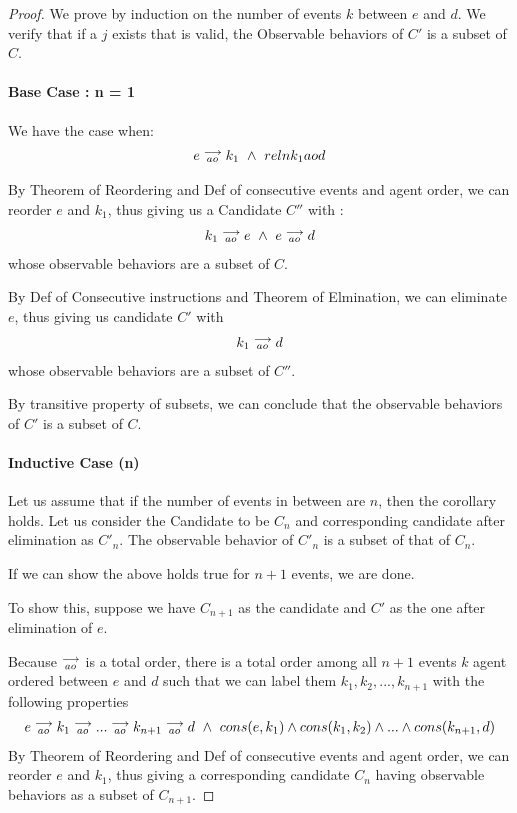 \begin{proof}
    We prove by induction on the number of events $k$ between $e$ and $d$. We verify that if a $j$ exists that is valid, the Observable behaviors of $C'$ is a subset of $C$.

    \paragraph{Base Case : n = 1}

        We have the case when:
        \begin{align*}
            e\stackrel{\longrightarrow}{_{ao}}k_1 \ \wedge \ reln{k_1}{ao}{d}
        \end{align*}

        By Theorem of Reordering and Def of consecutive events and agent order, we can reorder $e$ and $k_1$, thus giving us a Candidate $C''$ with :
        \begin{align*}
            k_1\stackrel{\longrightarrow}{_{ao}}e \ \wedge \ e\stackrel{\longrightarrow}{_{ao}}d
        \end{align*}  
        whose observable behaviors are a subset of $C$.

        By Def of Consecutive instructions and Theorem of Elmination, we can eliminate $e$, thus giving us candidate $C'$  with  
        \begin{align*}
            k_1\stackrel{\longrightarrow}{_{ao}}d
        \end{align*} 
        whose observable behaviors are a subset of $C''$.

        By transitive property of subsets, we can conclude that the observable behaviors of $C'$ is a subset of $C$. 
    \paragraph{Inductive Case (n)}

        Let us assume that if the number of events in between are $n$, then the corollary holds. Let us consider the Candidate to be $C_n$ and corresponding candidate after elimination as $C'_n$. The observable behavior of $C'_n$ is a subset of that of $C_n$.

        If we can show the above holds true for $n+1$ events, we are done.
        
        To show this, suppose we have $C_{n+1}$ as the candidate and $C'$ as the one after elimination of $e$. 
        
        Because $\stackrel{\longrightarrow}{_{ao}}$ is a total order, there is a total order among all $n+1$ events $k$ agent ordered between $e$ and $d$ such that we can label them $k_1, k_2 , ... , k_{n+1}$ with the following properties
        \begin{align*}
            \reln{e}{ao}{\reln{k_1}{ao}{\reln{...}{ao}{\reln{k_{n+1}}{ao}{d}}}} 
            \ \wedge \ 
            cons(e,k_1) \wedge cons(k_1, k_2) \wedge ... \wedge cons(k_{n+1}, d) 
        \end{align*}
        By Theorem of Reordering and Def of consecutive events and agent order, we can reorder $e$ and $k_1$, thus giving a corresponding candidate $C_n$ having observable behaviors as a subset of $C_{n+1}$. 


\end{proof}
